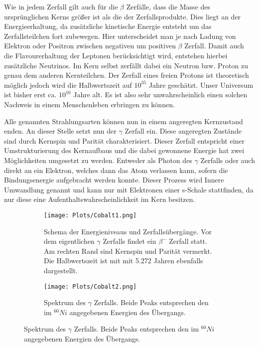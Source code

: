 \documentclass[]{article}
\begin{document}
	Wie in jedem Zerfall gilt auch für die $\beta$ Zerfälle, dass die Masse des ursprünglichen Kerns größer ist als die der Zerfallsprodukte. Dies liegt an der Energieerhaltung, da zusätzliche kinetische Energie entsteht um das Zerfallsteilchen fort zubewegen. Hier unterscheidet man je nach Ladung von Elektron oder Positron zwischen negativen um positiven $\beta$ Zerfall. Damit auch die Flavourerhaltung der Leptonen berücksichtigt wird, entstehen hierbei zusätzliche Neutrinos. Im Kern selbst zerfällt dabei ein Neutron bzw. Proton zu genau dem anderen Kernteilchen. Der Zerfall eines freien Protons ist theoretisch möglich jedoch wird die Halbwertszeit auf $10^{35}$ Jahre geschätzt. Unser Universum ist bisher erst ca. $10^{10}$ Jahre alt. Es ist also sehr unwahrscheinlich einen solchen Nachweis in einem Menschenleben erbringen zu können.
	
	Alle genannten Strahlungsarten können nun in einem angeregten Kernzustand enden. An dieser Stelle setzt nun der $\gamma$ Zerfall ein. Diese angeregten Zustände sind durch Kernspin und Parität charakterisiert. Dieser Zerfall entspricht einer Umstrukturierung des Kernaufbaus und die dabei gewonnene Energie hat zwei Möglichkeiten umgesetzt zu werden. Entweder als Photon des $\gamma$ Zerfalls oder auch direkt an ein Elektron, welches dann das Atom verlassen kann, sofern die Bindungsenergie aufgebracht werden konnte. Dieser Prozess wird Innere Umwandlung genannt und kann nur mit Elektronen einer s-Schale stattfinden, da nur diese eine Aufenthaltswahrscheinlichkeit im Kern besitzen.
	
	\begin{figure}[H]
		\centering
		\begin{subfigure}[b]{.48\textwidth}
			\centering
			\texttt{[image: Plots/Cobalt1.png]}
			\caption{Schema der Energieniveaus und Zerfallsübergänge. Vor dem eigentlichen $\gamma$ Zerfalls findet ein $\beta^-$ Zerfall statt. Am rechten Rand sind Kernspin und Parität vermerkt. Die Halbwertszeit ist mit mit 5.272 Jahren ebenfalls dargestellt.}
		\end{subfigure}
		\begin{subfigure}[b]{.48\textwidth}
			\centering
			\texttt{[image: Plots/Cobalt2.png]}
			\caption{Spektrum des $\gamma$ Zerfalls. Beide Peaks entsprechen den im $^{60}Ni$ angegebenen Energien des Übergangs. }
		\end{subfigure}
	
	\end{figure}
	
\end{document}
